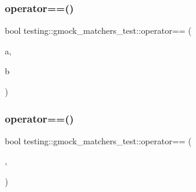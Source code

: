 \subsubsection{\texorpdfstring{operator==()}{operator==()}\hspace{0.1cm}{\footnotesize\ttfamily [2/3]}}
{\footnotesize\ttfamily bool testing\+::gmock\+\_\+matchers\+\_\+test\+::operator== (\begin{DoxyParamCaption}\item[{const \hyperlink{structtesting_1_1gmock__matchers__test_1_1_int_reference_wrapper}{Int\+Reference\+Wrapper} \&}]{a,  }\item[{const \hyperlink{structtesting_1_1gmock__matchers__test_1_1_int_reference_wrapper}{Int\+Reference\+Wrapper} \&}]{b }\end{DoxyParamCaption})}

\mbox{\label{namespacetesting_1_1gmock__matchers__test_a4b9f261a3b98ba0e0bca21b69d593241}} 
\subsubsection{\texorpdfstring{operator==()}{operator==()}\hspace{0.1cm}{\footnotesize\ttfamily [3/3]}}
{\footnotesize\ttfamily bool testing\+::gmock\+\_\+matchers\+\_\+test\+::operator== (\begin{DoxyParamCaption}\item[{const \hyperlink{classtesting_1_1gmock__matchers__test_1_1_unprintable}{Unprintable} \&}]{,  }\item[{const \hyperlink{classtesting_1_1gmock__matchers__test_1_1_unprintable}{Unprintable} \&}]{ }\end{DoxyParamCaption})\hspace{0.3cm}{\ttfamily [inline]}}

\mbox{\label{namespacetesting_1_1gmock__matchers__test_a8a0035a0de2d219d89ff7070762ece72}} 
